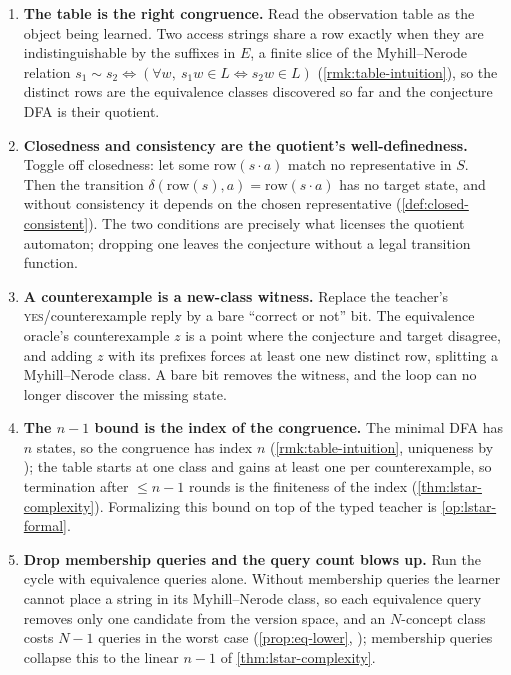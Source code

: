 \begin{enumerate}[leftmargin=*,itemsep=3pt]
\item \textbf{The table is the right congruence.} Read the observation table as the object being learned. Two access strings share a row exactly when they are indistinguishable by the suffixes in $E$, a finite slice of the Myhill--Nerode relation $s_1 \sim s_2 \iff (\forall w,\ s_1 w \in L \Leftrightarrow s_2 w \in L)$ (\cref{rmk:table-intuition}), so the distinct rows are the equivalence classes discovered so far and the conjecture DFA is their quotient.

\item \textbf{Closedness and consistency are the quotient's well-definedness.} Toggle off closedness: let some $\mathrm{row}(s\cdot a)$ match no representative in $S$. Then the transition $\delta(\mathrm{row}(s),a)=\mathrm{row}(s\cdot a)$ has no target state, and without consistency it depends on the chosen representative (\cref{def:closed-consistent}). The two conditions are precisely what licenses the quotient automaton; dropping one leaves the conjecture without a legal transition function.

\item \textbf{A counterexample is a new-class witness.} Replace the teacher's \textsc{yes}/counterexample reply by a bare ``correct or not'' bit. The equivalence oracle's counterexample $z$ is a point where the conjecture and target disagree, and adding $z$ with its prefixes forces at least one new distinct row, splitting a Myhill--Nerode class. A bare bit removes the witness, and the loop can no longer discover the missing state.

\item \textbf{The $n-1$ bound is the index of the congruence.} The minimal DFA has $n$ states, so the congruence has index $n$ (\cref{rmk:table-intuition}, uniqueness by \cite{RabinScott1959}); the table starts at one class and gains at least one per counterexample, so termination after $\le n-1$ rounds is the finiteness of the index (\cref{thm:lstar-complexity}). Formalizing this bound on top of the typed teacher is \cref{op:lstar-formal}.

\item \textbf{Drop membership queries and the query count blows up.} Run the cycle with equivalence queries alone. Without membership queries the learner cannot place a string in its Myhill--Nerode class, so each equivalence query removes only one candidate from the version space, and an $N$-concept class costs $N-1$ queries in the worst case (\cref{prop:eq-lower}, \cite{Angluin1988}); membership queries collapse this to the linear $n-1$ of \cref{thm:lstar-complexity}.


\end{enumerate}
